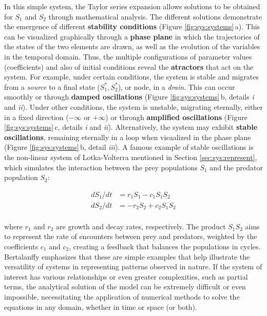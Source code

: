 \documentclass[./main_en.tex]{subfiles}
\begin{document}
\par In this simple \gls{system}, the Taylor series expansion allows solutions to be obtained for $S_1$ and $S_2$ through mathematical analysis. The different solutions demonstrate the emergence of different \textbf{stability conditions} (Figure \ref{fig:sys:systems}\,a). This can be visualized graphically through a \textbf{phase plane} in which the trajectories of the states of the two elements are drawn, as well as the evolution of the variables in the temporal domain. Thus, the multiple configurations of parameter values (coefficients) and also of initial conditions reveal the \textbf{\gls{atractors}} that act on the \gls{system}. For example, under certain conditions, the \gls{system} is stable and migrates from a \textit{source} to a final state ($S^*_1, S^*_2$), or node, in a \textit{drain}. This can occur smoothly or through \textbf{damped oscillations} (Figure \ref{fig:sys:systems}\,b, details \textrm{\textit{i}} and \textrm{\textit{ii}}). Under other conditions, the \gls{system} is unstable, migrating eternally, either in a fixed direction ($-\infty$ or $+\infty$) or through \textbf{amplified oscillations} (Figure \ref{fig:sys:systems}\,c, details \textrm{\textit{i}} and \textrm{\textit{ii}}). Alternatively, the \gls{system} may exhibit \textbf{stable oscillations}, remaining eternally in a loop when visualized in the phase plane (Figure \ref{fig:sys:systems}\,b, detail \textrm{\textit{iii}}). A famous example of stable oscillations is the non-linear \gls{system} of Lotka-Volterra mentioned in Section \ref{sec:sys:represent}, which simulates the interaction between the prey populations $S_1$ and the predator population $S_2$:
\begin{linenomath*}
\[
\begin{split}
    dS_1/dt &= r_{1}S_1 - c_{1}S_1S_2\\
    dS_2/dt &= -r_{2}S_2 + c_{2}S_1S_2\\
\end{split}
\]
\end{linenomath*}
where $r_1$ and $r_2$ are growth and decay rates, respectively. The product $S_1S_2$ aims to represent the rate of encounters between prey and predators, weighted by the coefficients $c_1$ and $c_2$, creating a \gls{feedback} that balances the populations in cycles. Bertalanffy emphasizes that these are simple examples that help illustrate the versatility of systems in representing patterns observed in nature. If the \gls{system} of interest has various relationships or even greater complexities, such as partial terms, the analytical solution of the \gls{model} can be extremely difficult or even impossible, necessitating the application of numerical methods to solve the equations in any domain, whether in time or space (or both).
\end{document}
